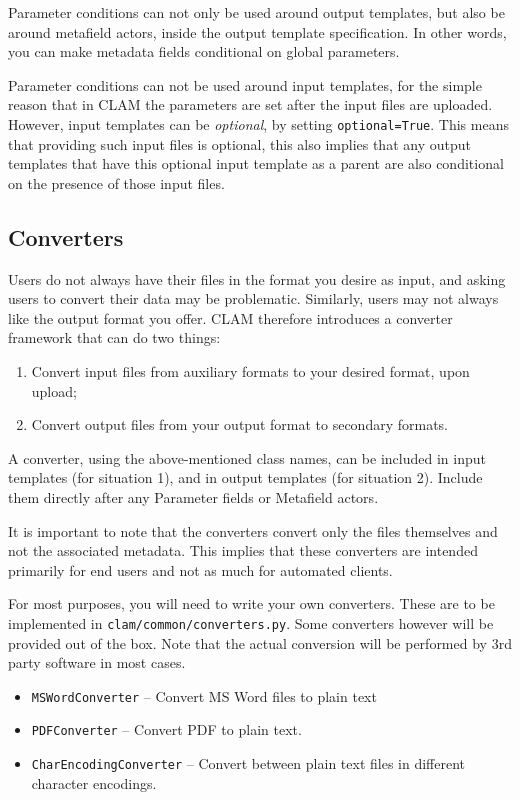 \documentclass[a4paper,12pt]{report}
\begin{document}
Parameter conditions can not only be used around output templates, but also be around metafield actors, inside the output template specification. In other words, you can make metadata fields conditional on global parameters.

Parameter conditions can not be used around input templates, for the simple reason that in CLAM the parameters are set after the input files are uploaded. However, input templates can be \emph{optional}, by setting \texttt{optional=True}. This means that providing such input files is optional, this also implies that any output templates that have this optional input template as a parent are also conditional on the presence of those input files.


\subsection{Converters}

Users do not always have their files in the format you desire as input, and asking users to convert their data may be problematic. Similarly, users may not always like the output format you offer. CLAM therefore introduces a converter framework that can do two things:

\begin{enumerate}
\item Convert input files from auxiliary formats to your desired format, upon upload;
\item Convert output files from your output format to secondary formats.
\end{enumerate}

A converter, using the above-mentioned class names, can be included in input templates (for situation 1), and in output templates (for situation 2). Include them directly after any Parameter fields or Metafield actors.

It is important to note that the converters convert only the files themselves and not the associated metadata. This implies that these converters are intended primarily for end users and not as much for automated clients.

For most purposes, you will need to write your own converters. These are to be implemented in \texttt{clam/common/converters.py}. Some converters however will be provided out of the box. Note that the actual conversion will be performed by 3rd party software in most cases.

\begin{itemize}
\item \texttt{MSWordConverter} -- Convert MS Word files to plain text
\item \texttt{PDFConverter} -- Convert PDF to plain text.
\item \texttt{CharEncodingConverter} -- Convert between plain text files in different character encodings.
\end{itemize}
\end{document}

